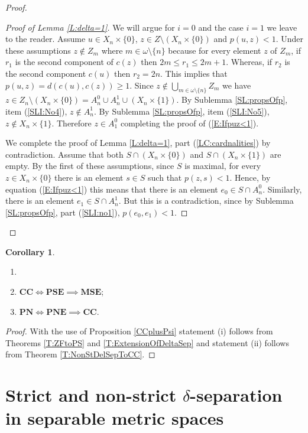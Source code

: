\documentclass[11pt, reqno]{amsart}
\theoremstyle{definition}
\numberwithin{theorem}{section}
\theoremstyle{definition}
\theoremstyle{definition}
\theoremstyle{definition}
\theoremstyle{definition}
\theoremstyle{definition}
\numberwithin{claim}{section}
\theoremstyle{definition}
\theoremstyle{definition}
\newtheorem{corollary}[theorem]{Corollary}
\theoremstyle{definition}
\theoremstyle{definition}
\theoremstyle{definition}
\theoremstyle{remboldstyle}
\begin{document}
\begin{proof}
\begin{proof}[Proof of Lemma \ref{L:delta=1}]
We will argue for $i=0$ and the case $i=1$ we leave to the reader. Assume $u \in X_n \times \{ 0 \}$, $z \in Z \setminus (X_n \times \{ 0 \})$ and $p(u,z) < 1$.  Under these assumptions $z \notin Z_m$ where $m \in \omega \setminus \{ n \}$ because for every element $z$ of $Z_m$, if $r_1$ is the second component of $c(z)$ then $2m \le r_1 \le 2m + 1$.  Whereas, if $r_2$ is the second component $c(u)$ then $r_2 = 2n$.  This implies that $p(u,z) = d(c(u),c(z)) \ge 1$.  Since $z \notin \bigcup_{m \in \omega \setminus \{ n \}} Z_m$ we have $z \in Z_n \setminus (X_n \times \{ 0 \}) =  A^0_n \cup A^1_n \cup  (X_n \times \{ 1 \})$.  
By Sublemma \ref{SL:propsOfp}, item (\ref{SLI:No4}), $z \notin A^1_n$.  By Sublemma \ref{SL:propsOfp}, item (\ref{SLI:No5}), $z \notin X_n \times \{ 1 \}$.  
Therefore $z \in A^0_1$ completing the proof of (\ref{E:Ifpuz<1}).
\par 
We complete the proof of Lemma \ref{L:delta=1}, part (\ref{LC:cardnalities}) by contradiction.  Assume that both $S \cap (X_n  \times \{ 0 \})$ and $S \cap (X_n \times \{ 1 \})$ are empty.  By the first of these assumptions, since $S$ is maximal, for every $z \in X_n \times \{ 0 \}$ there is an element $s \in S$ such that $p(z,s) < 1$. Hence, by equation (\ref{E:Ifpuz<1}) this means that there is an element $e_0 \in S \cap A^0_n$.  Similarly, there is an element $e_1 \in S \cap A^1_n$.  But this is a contradiction, since by Sublemma \ref{SL:propsOfp}, part (\ref{SLI:no1}), $p(e_0,e_1) < 1$.
\end{proof}
\end{proof}
\begin{corollary} \label{C:CCiffPSE}
\begin{enumerate}
\item[]
\item[(i)] $\textbf{CC} \iff \textbf{PSE} \implies \textbf{MSE}$;
\item[(ii)] $ \textbf{PN} \iff \textbf{PNE} \implies \textbf{CC}$.
\end{enumerate}
    
\end{corollary}

\begin{proof}
With the use of Proposition \ref{CCplusPsi} statement (i) follows from  Theorems \ref{T:ZFtoPS} and \ref{T:ExtensionOfDeltaSep} and statement (ii) follows from  Theorem \ref{T:NonStDelSepToCC}. 
\end{proof}


\section{Strict and non-strict $\delta$-separation in separable metric spaces}\label{S:InMetricSpaces}
\end{document}
